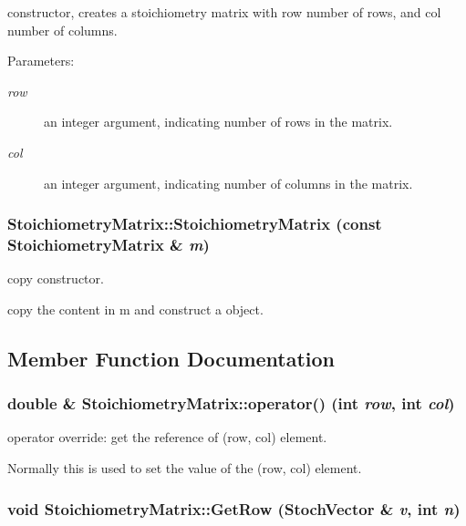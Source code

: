 constructor, creates a stoichiometry matrix with row number of rows, and col number of columns. 

\begin{Desc}
\item[Parameters:]
\begin{description}
\item[{\em row}]an integer argument, indicating number of rows in the matrix. \item[{\em col}]an integer argument, indicating number of columns in the matrix. \end{description}
\end{Desc}
\hypertarget{class_stoichiometry_matrix_12024b0f318c252a071fe3d9f4909352}{
\subsubsection{\setlength{\rightskip}{0pt plus 5cm}StoichiometryMatrix::StoichiometryMatrix (const {\bf StoichiometryMatrix} \& {\em m})}}
\label{class_stoichiometry_matrix_12024b0f318c252a071fe3d9f4909352}


copy constructor. 

copy the content in m and construct a object. 

\subsection{Member Function Documentation}
\hypertarget{class_stoichiometry_matrix_0bc6ebe7b84a1eeeec7190e4563a4648}{
\subsubsection{\setlength{\rightskip}{0pt plus 5cm}double \& StoichiometryMatrix::operator() (int {\em row}, \/  int {\em col})}}
\label{class_stoichiometry_matrix_0bc6ebe7b84a1eeeec7190e4563a4648}


operator override: get the reference of (row, col) element. 

Normally this is used to set the value of the (row, col) element. \hypertarget{class_stoichiometry_matrix_8bffb2859030b110bafb924557ef611b}{
\subsubsection{\setlength{\rightskip}{0pt plus 5cm}void StoichiometryMatrix::GetRow ({\bf StochVector} \& {\em v}, \/  int {\em n})}}
\label{class_stoichiometry_matrix_8bffb2859030b110bafb924557ef611b}


